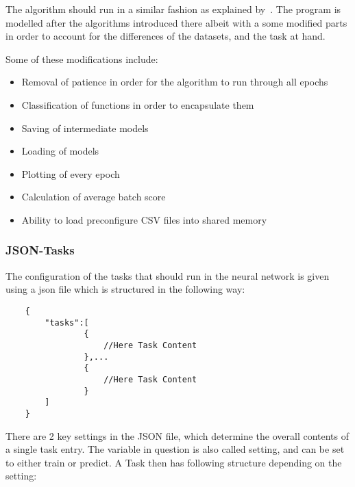 \documentclass[12pt]{article}
\begin{document}
The algorithm should run in a similar fashion as explained by~\citet{theanoTutorial}. The program is modelled after the algorithms introduced there albeit with a some modified parts in order to account for the differences of the datasets, and the task at hand.

Some of these modifications include: 
\begin{itemize}
    \item Removal of patience in order for the algorithm to run through all epochs
    \item Classification of functions in order to encapsulate them
    \item Saving of intermediate models
    \item Loading of models
    \item Plotting of every epoch
    \item Calculation of average batch score
    \item Ability to load preconfigure CSV files into shared memory
\end{itemize}

\subsubsection{JSON-Tasks}
\label{subsub:json}

The configuration of the tasks that should run in the neural network is given using a json file which is structured in the following way:
\begin{verbatim}
    {
        "tasks":[
                {
                    //Here Task Content    
                },...
                {
                    //Here Task Content 
                }
        ]
    }
\end{verbatim}

There are 2 key settings in the JSON file, which determine the overall contents of a single task entry. The variable in question is also called setting, and can be set to either train or predict. A Task then has following structure depending on the setting:
\end{document}

